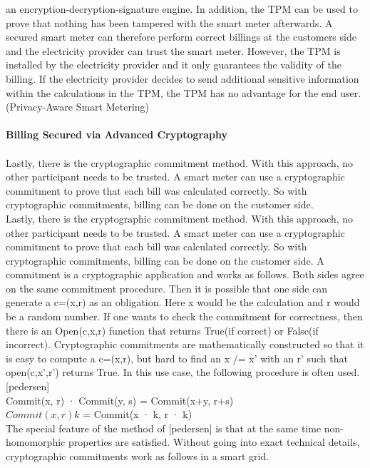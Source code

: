 an encryption-decryption-signature engine. In addition, the TPM can be used to prove that nothing has been tampered with the smart meter afterwards. A secured smart meter can therefore perform correct billings at the customers side and the electricity provider can trust the smart meter. However, the TPM is installed by the electricity provider and it only guarantees the validity of the billing. If the electricity provider decides to send additional sensitive information within the calculations in the TPM, the TPM has no advantage for the end user.(Privacy-Aware Smart Metering)\\
\\
\textbf{Billing Secured via Advanced Cryptography}
\\
\\
Lastly, there is the cryptographic commitment method.
With this approach, no other participant needs to be trusted. A smart meter can use a cryptographic commitment to prove that each bill was calculated correctly. So with cryptographic commitments, billing can be done on the customer side.\\
Lastly, there is the cryptographic commitment method.
With this approach, no other participant needs to be trusted. A smart meter can use a cryptographic commitment to prove that each bill was calculated correctly. So with cryptographic commitments, billing can be done on the customer side. A commitment is a cryptographic application and works as follows. Both sides agree on the same commitment procedure. Then it is possible that one side can generate a c=(x,r) as an obligation. Here x would be the calculation and r would be a random number. If one wants to check the commitment for correctness, then there is an Open(c,x,r) function that returns True(if correct) or False(if incorrect).
Cryptographic commitments are mathematically constructed so that it is easy to compute a c=(x,r), but hard to find an x /= x' with an r' such that open(c,x',r') returns True. In this use case, the following procedure is often used. [pedersen] \\
Commit(x, r) · Commit(y, s) = Commit(x+y, r+s)\\
$Commit(x, r){k}$ = Commit(x · k, r · k)\\
The special feature of the method of [pedersen] is that at the same time non-homomorphic properties are satisfied. Without going into exact technical details, cryptographic commitments work as follows in a smart grid.

